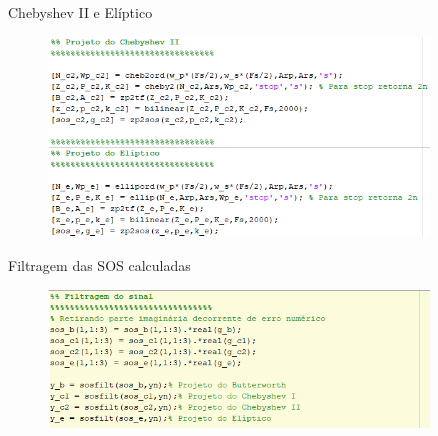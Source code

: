 \begin{frame}{Chebyshev II e Elíptico}
    \begin{figure}[!htb]
    \includegraphics[width=0.9\textwidth]{graficos/code_chebII_ellip.png}
    \end{figure} 
\end{frame}


\begin{frame}{Filtragem das SOS calculadas}
    \begin{figure}[!htb]
    \includegraphics[width=0.9\textwidth]{graficos/code_sos_filtros.png}
    \end{figure} 
\end{frame}